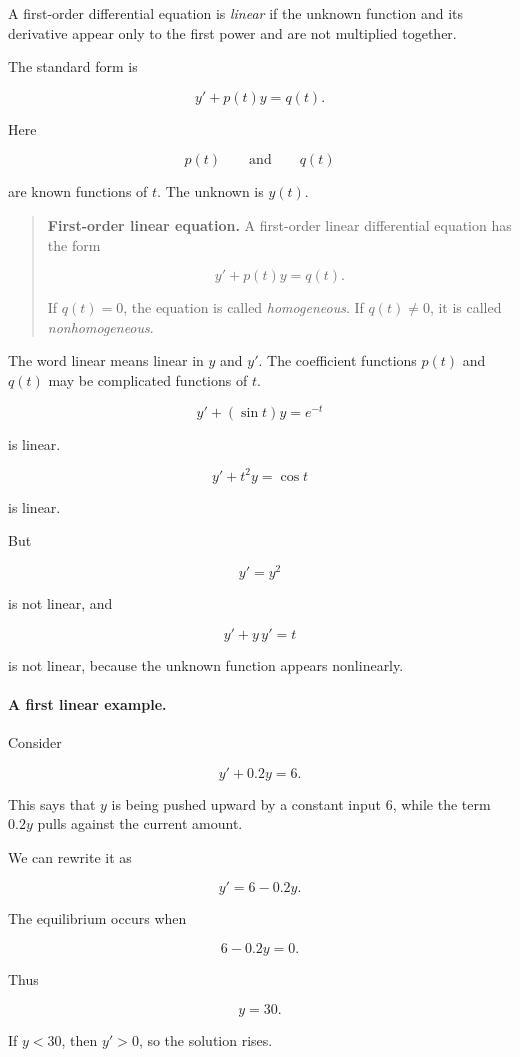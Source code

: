 A first-order differential equation is \emph{linear} if the unknown function and its
derivative appear only to the first power and are not multiplied together.

The standard form is

\[
\boxed{
y'+p(t)y=q(t).
}
\]

Here

\[
p(t)
\qquad\text{and}\qquad
q(t)
\]

are known functions of \(t\).  The unknown is \(y(t)\).

\begin{quote}
\textbf{First-order linear equation.}
A first-order linear differential equation has the form

\[
\boxed{
y'+p(t)y=q(t).
}
\]

If \(q(t)=0\), the equation is called \emph{homogeneous}.  If \(q(t)\neq0\), it is called
\emph{nonhomogeneous}.
\end{quote}

The word linear means linear in \(y\) and \(y'\).  The coefficient functions \(p(t)\) and
\(q(t)\) may be complicated functions of \(t\).

\[
y'+(\sin t)y=e^{-t}
\]

is linear.

\[
y'+t^2y=\cos t
\]

is linear.

But

\[
y'=y^2
\]

is not linear, and

\[
y'+y\,y'=t
\]

is not linear, because the unknown function appears nonlinearly.

\paragraph{A first linear example.}
Consider

\[
y'+0.2y=6.
\]

This says that \(y\) is being pushed upward by a constant input \(6\), while the term
\(0.2y\) pulls against the current amount.

We can rewrite it as

\[
y'=6-0.2y.
\]

The equilibrium occurs when

\[
6-0.2y=0.
\]

Thus

\[
y=30.
\]

If \(y<30\), then \(y'>0\), so the solution rises.

